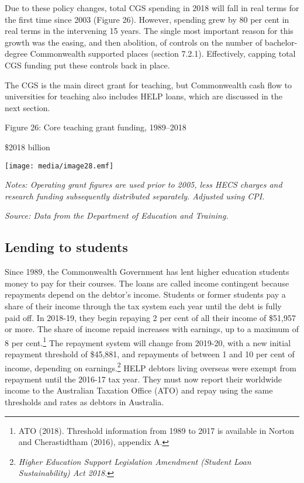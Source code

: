 \documentclass[]{book}
\begin{document}
Due to these policy changes, total CGS spending in 2018 will fall in real terms for the first time since 2003 (Figure 26). However, spending grew by 80 per cent in real terms in the intervening 15 years. The single most important reason for this growth was the easing, and then abolition, of controls on the number of bachelor-degree Commonwealth supported places (section 7.2.1). Effectively, capping total CGS funding put these controls back in place.

The CGS is the main direct grant for teaching, but Commonwealth cash flow to universities for teaching also includes HELP loans, which are discussed in the next section.

\protect\hypertarget{_Ref519005469}{}{}Figure 26: Core teaching grant funding, 1989--2018

\$2018 billion

\texttt{[image: media/image28.emf]}

\emph{Notes: Operating grant figures are used prior to 2005, less HECS charges and research funding subsequently distributed separately. Adjusted using CPI.}

\emph{Source: Data from the Department of Education and Training. }

\hypertarget{lending-to-students}{%
\subsection{Lending to students}\label{lending-to-students}}

Since 1989, the Commonwealth Government has lent higher education students money to pay for their courses. The loans are called income contingent because repayments depend on the debtor's income. Students or former students pay a share of their income through the tax system each year until the debt is fully paid off. In 2018-19, they begin repaying 2 per cent of all their income of \$51,957 or more. The share of income repaid increases with earnings, up to a maximum of 8 per cent.\footnote{ATO (2018). Threshold information from 1989 to 2017 is available in Norton and Cherastidtham (2016), appendix A.} The repayment system will change from 2019-20, with a new initial repayment threshold of \$45,881, and repayments of between 1 and 10 per cent of income, depending on earnings.\footnote{\emph{Higher Education Support Legislation Amendment (Student Loan Sustainability) Act 2018}.} HELP debtors living overseas were exempt from repayment until the 2016-17 tax year. They must now report their worldwide income to the Australian Taxation Office (ATO) and repay using the same thresholds and rates as debtors in Australia.
\end{document}
